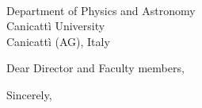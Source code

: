 \documentclass[letterpaper,12pt]{letter}
\begin{document}

\date{19 January 2038}

\signature{Dr. Andrea Capra\\
           Associate Research Scientist}

\begin{letter}{\\Department of Physics and Astronomy\\Canicatt\`i University\\Canicatt\`i (AG), Italy}
\opening{Dear Director and Faculty members,}

\lipsum[2-4]

\closing{Sincerely,}

\end{letter}
\end{document}
